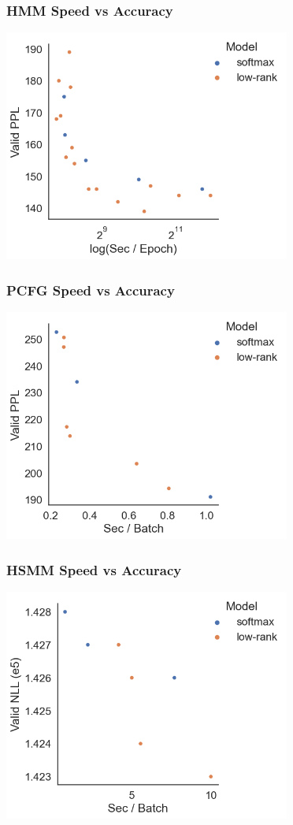\documentclass{beamer}
\begin{document}
\begin{frame}
\frametitle{HMM Speed vs Accuracy}
\centering
\includegraphics[height=3in]{imgs/hmm/lhmm-speed-accuracy.png}
\end{frame}

\begin{frame}
\frametitle{PCFG Speed vs Accuracy}
\centering
\includegraphics[height=3in]{imgs/hmm/pcfg-speed-accuracy.png}
\end{frame}

\begin{frame}
\frametitle{HSMM Speed vs Accuracy}
\centering
\includegraphics[height=3in]{imgs/hmm/hsmm-speed-accuracy.png}
\end{frame}
\end{document}
